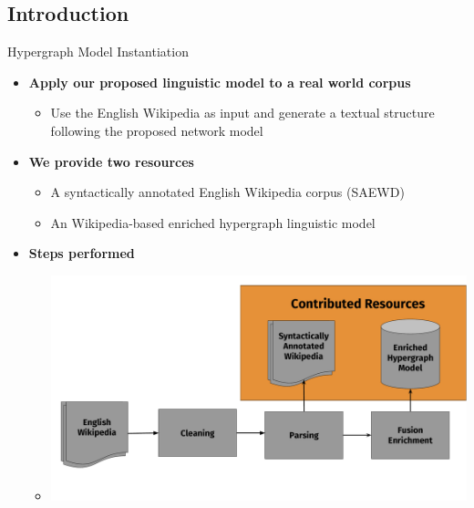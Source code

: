 \documentclass[10pt,xcolor=table]{beamer}
\begin{document}
\subsection{Introduction}
\begin{frame}{Hypergraph Model Instantiation}
\begin{itemize}[<+- | alert@+>]
\item \large \textbf{Apply our proposed linguistic model to a real world corpus}
	\begin{itemize}
	\item Use the English Wikipedia as input and generate a textual structure following the proposed network model
	\end{itemize}
\item \large \textbf{We provide two resources}
\begin{itemize}
	\item A syntactically annotated English Wikipedia corpus (SAEWD)
	\item An Wikipedia-based enriched hypergraph linguistic model 
\end{itemize}
\item \large \textbf{Steps performed}	
\begin{itemize}
	\item[] \begin{center}
		\includegraphics[width=0.7\linewidth]{image2/Chapitre7/saewd}
		\end{center}

\end{itemize}

\end{itemize}

\end{frame} 
\end{document}
